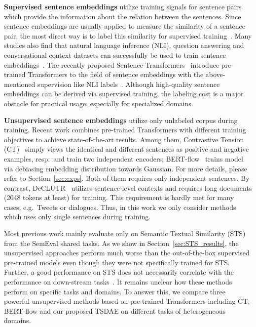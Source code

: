 \documentclass[11pt,a4paper]{article}
\begin{document}
\textbf{Supervised sentence embeddings} utilize training signals for sentence pairs which provide the information about the relation between the sentences. Since sentence embeddings are usually applied to measure the similarity of a sentence pair, the most direct way is to label this similarity for supervised training~\citep{DBLP:journals/corr/HendersonASSLGK17}. Many studies also find that natural language inference (NLI), question answering and conversational context datasets can successfully be used to train sentence embeddings~\citep{conneau-EtAl:2017:EMNLP2017,DBLP:conf/emnlp/CerYKHLJCGYTSK18}. The recently proposed Sentence-Transformers~\citep{DBLP:conf/emnlp/ReimersG19} introduce pre-trained Transformers to the field of sentence embeddings with the above-mentioned supervision like NLI labels~\citep{DBLP:conf/emnlp/BowmanAPM15,DBLP:conf/naacl/WilliamsNB18}. Although high-quality sentence embeddings can be derived via supervised training, the labeling cost is a major obstacle for practical usage, especially for specialized domains.

\textbf{Unsupervised sentence embeddings} utilize only unlabeled corpus during training. Recent work combines pre-trained Transformers with different training objectives to achieve state-of-the-art results. Among them,  Contrastive Tension (CT)~\citep{DBLP:journals/corr/abs-2006-03659} simply views the identical and different sentences as positive and negative examples, resp.\ and train two independent encoders; BERT-flow~\citep{DBLP:conf/emnlp/LiZHWYL20} trains model via debiasing embedding distribution towards Gaussian. For more details, please refer to Section~\ref{sec:exps}. Both of them requires only independent sentences. By contrast, DeCLUTR~\citep{DBLP:journals/corr/abs-2006-03659} utilizes sentence-level contexts and requires long documents (2048 tokens at least) for training. This requirement is hardly met for many cases, e.g.\ Tweets or dialogues. Thus, in this work we only consider methods which uses only single sentences during training.

Most previous work mainly evaluate only on Semantic Textual Similarity (STS) from the SemEval shared tasks. As we show in Section~\ref{sec:STS_results}, the unsupervised approaches perform much worse than the out-of-the-box supervised pre-trained models even though they were not specifically trained for STS. Further, a good performance on STS does not necessarily correlate with the performance on down-stream tasks~\citep{DBLP:conf/coling/ReimersBG16}. It remains unclear how these methods perform on specific tasks and domains. To answer this, we compare three powerful unsupervised methods based on pre-trained Transformers including CT, BERT-flow and our proposed TSDAE on different tasks of heterogeneous domains. 
\end{document}
